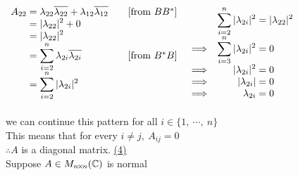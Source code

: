 \documentclass[12pt]{article}
\newcommand{\timesSmall}{{\mkern-2mu\times\mkern-2mu}}
\newcommand{\C}{\mathbb{C}}
\begin{document}
\\\\[15mm]
{$\begin{array}{r@{}>{\displaystyle}ll}
	A_{22} & {}= \lambda_{22} \overline{\lambda_{22}} +  \lambda_{12} \overline{\lambda_{12}} \hspace*{3.5mm} & [\text{from } BB^*]\\
	& {}= |\lambda_{22}|^2 + 0 & \text{}\\
	& {}= |\lambda_{22}|^2 & \text{}\\

	& {}= \sum_{i = 2}^{n} \lambda_{2i} \overline{\lambda_{2i}}   & [\text{from }B^*B]\\
	& {}= \sum_{i = 2}^{n} |\lambda_{2i}|^2   & \text{}\\

\end{array}$} \hspace*{25mm}%
{$\begin{array}{l>{\displaystyle}r@{}>{\displaystyle}ll}
	 & \sum_{i = 2}^{n} |\lambda_{2i}|^2  & {}= |\lambda_{22}|^2 \hspace*{0mm} & \text{}                     \\
	\Longrightarrow & \sum_{i = 3}^{n}|\lambda_{2i}|^2 & {}=0                & \text{}                          \\
	\Longrightarrow & |\lambda_{2i}|^2                     & {}=0                & \text{} \\
	\Longrightarrow & |\lambda_{2i}|         & {}=0                & \text{}                          \\
	\Longrightarrow & \lambda_{2i}       & {}=0                & \text{}                            \\
\end{array}$}
\\\\[5mm]
\noindent we can continue this pattern for all $i \in \{1, \ \cdots , \ n\}$\\
This means that for every $i \not = j,\ A_{ij} = 0$\\
$\therefore A $ is a diagonal matrix. 
\newpage
\hyperlink{toc}{\hypertarget{1.4}{(4)}}\\
Suppose $A\in M_{n\timesSmall n}(\C)$ is normal\\%
\end{document}
